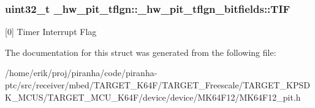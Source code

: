 \subsubsection[{\texorpdfstring{T\+IF}{TIF}}]{\setlength{\rightskip}{0pt plus 5cm}uint32\+\_\+t \+\_\+hw\+\_\+pit\+\_\+tflgn\+::\+\_\+hw\+\_\+pit\+\_\+tflgn\+\_\+bitfields\+::\+T\+IF}\hypertarget{struct__hw__pit__tflgn_1_1__hw__pit__tflgn__bitfields_a21fa53d33652f972ab1701f58794b3df}{}\label{struct__hw__pit__tflgn_1_1__hw__pit__tflgn__bitfields_a21fa53d33652f972ab1701f58794b3df}
\mbox{[}0\mbox{]} Timer Interrupt Flag 

The documentation for this struct was generated from the following file\+:\begin{DoxyCompactItemize}
\item 
/home/erik/proj/piranha/code/piranha-\/ptc/src/receiver/mbed/\+T\+A\+R\+G\+E\+T\+\_\+\+K64\+F/\+T\+A\+R\+G\+E\+T\+\_\+\+Freescale/\+T\+A\+R\+G\+E\+T\+\_\+\+K\+P\+S\+D\+K\+\_\+\+M\+C\+U\+S/\+T\+A\+R\+G\+E\+T\+\_\+\+M\+C\+U\+\_\+\+K64\+F/device/device/\+M\+K64\+F12/M\+K64\+F12\+\_\+pit.\+h\end{DoxyCompactItemize}
